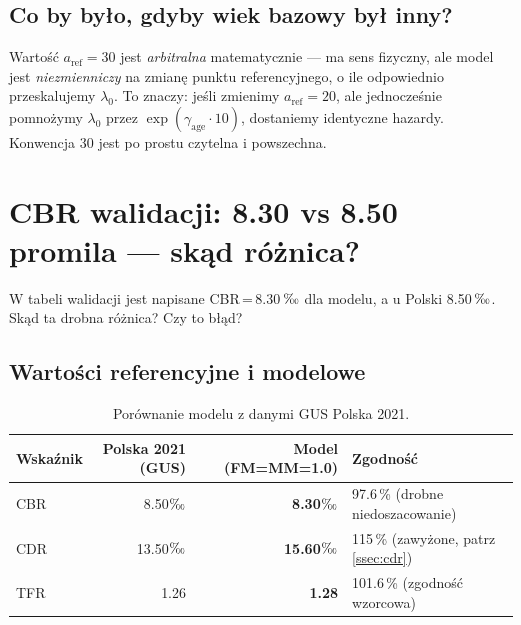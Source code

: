 \documentclass[11pt,a4paper]{article}
\newcommand{\promile}{\ensuremath{\text{\textperthousand}}}
\begin{document}
\subsection{Co by było, gdyby wiek bazowy był inny?}

\begin{warnbox}
Wartość $a_{\text{ref}} = 30$ jest \emph{arbitralna} matematycznie --- ma sens fizyczny, ale model jest \emph{niezmienniczy} na zmianę punktu referencyjnego, o ile odpowiednio przeskalujemy $\lambda_0$. To znaczy: jeśli zmienimy $a_{\text{ref}} = 20$, ale jednocześnie pomnożymy $\lambda_0$ przez $\exp(\gamma_{\text{age}} \cdot 10)$, dostaniemy identyczne hazardy. Konwencja 30 jest po prostu czytelna i powszechna.
\end{warnbox}

\newpage
\section{CBR walidacji: 8.30 vs 8.50 promila --- skąd różnica?}

\begin{qbox}
W tabeli walidacji jest napisane CBR\,=\,8.30\,\promile{} dla modelu, a u Polski 8.50\,\promile{}. Skąd ta drobna różnica? Czy to błąd?
\end{qbox}

\subsection{Wartości referencyjne i modelowe}

\begin{table}[h]
\centering
\small
\begin{tabular}{lrrl}
\toprule
\textbf{Wskaźnik} & \textbf{Polska 2021 (GUS)} & \textbf{Model (FM=MM=1.0)} & \textbf{Zgodność} \\
\midrule
CBR        & 8.50\promile  & \textbf{8.30\promile}  & 97.6\,\% (drobne niedoszacowanie) \\
CDR        & 13.50\promile & \textbf{15.60\promile} & 115\,\% (zawyżone, patrz \ref{ssec:cdr}) \\
TFR        & 1.26          & \textbf{1.28}          & 101.6\,\% (zgodność wzorcowa) \\
\bottomrule
\end{tabular}
\caption{Porównanie modelu z danymi GUS Polska 2021.}
\end{table}
\end{document}
